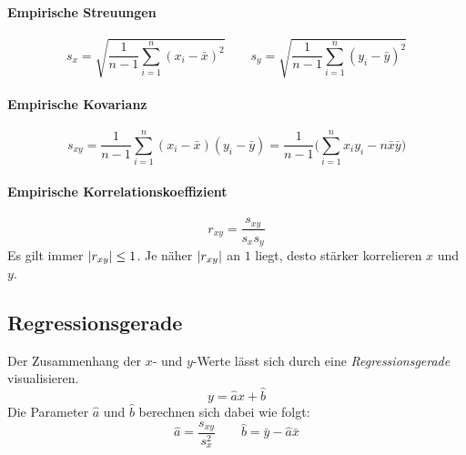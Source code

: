                 \paragraph{Empirische Streuungen}
                \begin{equation*}
                    s_x = \sqrt{\frac{1}{n - 1} \sum_{i = 1}^{n} (x_i - \bar{x})^2} \qquad s_y = \sqrt{\frac{1}{n - 1} \sum_{i = 1}^{n} (y_i - \bar{y})^2}
                \end{equation*}
                
                \paragraph{Empirische Kovarianz}
                \begin{equation*}
                    s_{xy} = \frac{1}{n - 1} \sum_{i = 1}^{n} (x_i - \bar{x}) (y_i - \bar{y}) = \frac{1}{n - 1} \Bigg( \sum_{i = 1}^n x_i y_i - n\bar{x}\bar{y} \Bigg)
                \end{equation*}
                
                \paragraph{Empirische Korrelationskoeffizient}
                \begin{equation*}
                    r_{xy} = \frac{s_{xy}}{s_x s_y}
                \end{equation*}
                Es gilt immer \( \abs{r_{xy}} \leq 1 \). Je näher \( \abs{r_{xy}} \) an \(1\) liegt, desto stärker korrelieren \(x\) und \(y\).

        \subsection{Regressionsgerade}
            Der Zusammenhang der \(x\)- und \(y\)-Werte lässt sich durch eine \textit{Regressionsgerade} visualisieren.
           	\begin{equation*}
            	y = \hat{a} x + \hat{b}
           	\end{equation*}
           	Die Parameter \( \hat{a} \) und \( \hat{b} \) berechnen sich dabei wie folgt:
           	\begin{equation*}
               	\hat{a} = \frac{s_{xy}}{s_x^2} \qquad \hat{b} = \bar{y} - \hat{a} \bar{x}
           	\end{equation*}
           	
